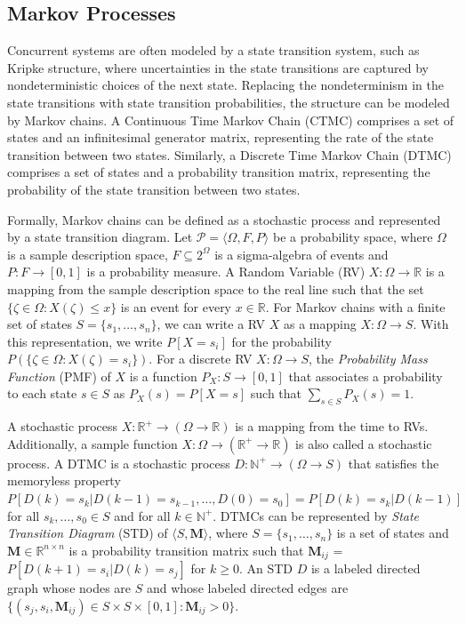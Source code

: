 \documentclass[
graybox,
envcountchap
]{svmult}
\begin{document}
\begin{bibunit}


    \subsection{Markov Processes}

Concurrent systems are often modeled by a state transition system, such as Kripke structure, where uncertainties in the state transitions are captured by nondeterministic choices of the next state. Replacing the nondeterminism in the state transitions with state transition probabilities, the structure can be modeled by Markov chains. A Continuous Time Markov Chain (CTMC) comprises a set of states and an infinitesimal generator matrix, representing the rate of the state transition between two states. Similarly, a Discrete Time Markov Chain (DTMC) comprises a set of states and a probability transition matrix, representing the probability of the state transition between two states. 


Formally, Markov chains can be defined as a stochastic process and represented by a state transition diagram. Let $\mathcal{P}=\langle\Omega,F,P\rangle$ be a probability space, where $\Omega$ is a sample description space, $F\subseteq 2^\Omega$ is a sigma-algebra of events and $P:F\rightarrow[0,1]$ is a probability measure. A Random Variable (RV) $X:\Omega\rightarrow\mathbb{R}$ is a mapping from the sample description space to the real line such that the set $\{\zeta\in\Omega:X(\zeta)\leq x\}$ is an event for every $x\in\mathbb{R}$. For Markov chains with a finite set of states $S=\{s_1,\ldots,s_n\}$, we can write a RV $X$ as a mapping $X:\Omega\rightarrow S$. With this representation, we write $P[X=s_i]$ for the probability $P(\{\zeta\in\Omega:X(\zeta)=s_i\})$. 
For a discrete RV $X:\Omega\rightarrow S$, the {\em Probability Mass Function} (PMF) of $X$ is a function $P_X:S\rightarrow[0,1]$ that associates a probability to each state $s\in S$ as $P_X(s)=P[X=s]$ such that $\sum_{s\in S} P_X(s)=1$.


A stochastic process $X:\mathbb{R}^+\rightarrow(\Omega\rightarrow\mathbb{R})$ is a mapping from the time to RVs. Additionally, a sample function $X:\Omega\rightarrow(\mathbb{R}^+\rightarrow\mathbb{R})$ is also called a stochastic process. A DTMC is a stochastic process $D:\mathbb{N}^+\rightarrow(\Omega\rightarrow S)$ that satisfies the memoryless property $P[D(k)=s_k|D(k-1)=s_{k-1},\ldots,D(0)=s_0]=P[D(k)=s_k|D(k-1)]$ for all $s_k,\ldots,s_0\in S$ and for all $k\in\mathbb{N}^+$. DTMCs can be represented by {\em State Transition Diagram} (STD) of $\langle S,\mathbf{M}\rangle$, where $S=\{s_1,\ldots,s_n\}$ is a set of states and $\mathbf{M}\in\mathbb{R}^{n\times n}$ is a probability transition matrix such that $\mathbf{M}_{ij}$ = $P[D(k+1)=s_i|D(k)=s_j]$ for $k\geq 0$. An STD $D$ is a labeled directed graph whose nodes are $S$ and whose labeled directed edges are $\{(s_j, s_i, \mathbf{M}_{ij})\in S\times S\times [0,1]: \mathbf{M}_{ij} > 0\}$.



\end{bibunit}
\end{document}
